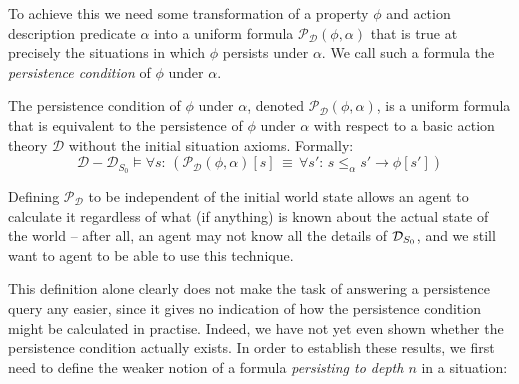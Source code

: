 To achieve this we need some transformation of a property $\phi$
and action description predicate $\alpha$ into a uniform formula
$\mathcal{P}_{\mathcal{D}}(\phi,\alpha)$ that is true at precisely
the situations in which $\phi$ persists under $\alpha$. We call
such a formula the \emph{persistence condition} of $\phi$ under $\alpha$.

\begin{defnL}
 The persistence condition of $\phi$
under $\alpha$, denoted $\mathcal{P}_{\mathcal{D}}(\phi,\alpha)$,
is a uniform formula that is equivalent to the persistence of $\phi$
under $\alpha$ with respect to a basic action theory $\mathcal{D}$
without the initial situation axioms. Formally:\label{def:persistence-condition}\[
\mathcal{D}-\mathcal{D}_{S_{0}}\models\forall s:\,\left(\mathcal{P_{D}}(\phi,\alpha)[s]\,\equiv\,\forall s':\, s\leq_{\alpha}s'\rightarrow\phi[s']\right)\]

\end{defnL}
Defining $\mathcal{P}_{\mathcal{D}}$ to be independent of the initial
world state allows an agent to calculate it regardless of what (if
anything) is known about the actual state of the world -- after all,
an agent may not know all the details of $\mathcal{D}_{S_{0}}$, and we still
want to agent to be able to use this technique.

This definition alone clearly does not make the task of answering
a persistence query any easier, since it gives no indication of how
the persistence condition might be calculated in practise. Indeed,
we have not yet even shown whether the persistence condition actually
exists. In order to establish these results, we first need to define
the weaker notion of a formula \emph{persisting to depth $n$} in
a situation:

